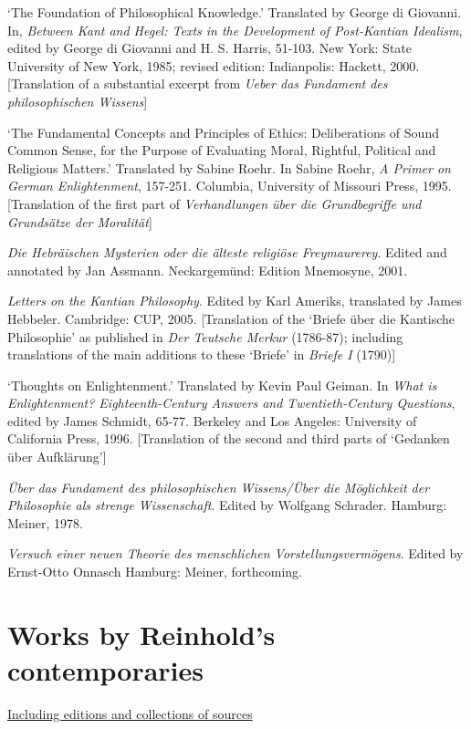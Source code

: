 `The Foundation of Philosophical Knowledge.' Translated by George di Giovanni. In, \textit{Between Kant and Hegel: Texts in the Development of Post{-}Kantian Idealism}, edited by George di Giovanni and H. S. Harris, 51{-}103. New York: State University of New York, 1985; revised edition: Indianpolis: Hackett, 2000. [Translation of a substantial excerpt from\textit{ Ueber das Fundament des philosophischen Wissens}]

`The Fundamental Concepts and Principles of Ethics: Deliberations of Sound Common Sense, for the Purpose of Evaluating Moral, Rightful, Political and Religious Matters.'  Translated by Sabine Roehr. In Sabine Roehr, \textit{A Primer on German Enlightenment}, 157{-}251. Columbia, University of Missouri Press, 1995. [Translation of the first part of \textit{Verhandlungen \"{u}ber die Grundbegriffe und Grunds\"{a}tze der Moralit\"{a}t}]

\textit{Die Hebr\"{a}ischen Mysterien oder die \"{a}lteste religi\"{o}se Freymaurerey}. Edited and annotated by Jan Assmann. Neckargem\"{u}nd: Edition Mnemosyne, 2001.

\textit{Letters on the Kantian Philosophy}. Edited by Karl Ameriks, translated by James Hebbeler. Cambridge: CUP, 2005. [Translation of the `Briefe \"{u}ber die Kantische Philosophie' as published in \textit{Der Teutsche Merkur} (1786{-}87); including translations of the main additions to these `Briefe' in \textit{Briefe I} (1790)]

`Thoughts on Enlightenment.' Translated by Kevin Paul Geiman. In \textit{What is Enlightenment? Eighteenth{-}Century Answers and Twentieth{-}Century Questions}, edited by James Schmidt, 65{-}77. Berkeley and Los Angeles: University of California Press, 1996. [Translation of the second and third parts of `Gedanken \"{u}ber Aufkl\"{a}rung']

\textit{\"{U}ber das Fundament des philosophischen Wissens/\"{U}ber die M\"{o}glichkeit der Philosophie als strenge Wissenschaft}. Edited by Wolfgang Schrader. Hamburg: Meiner, 1978.

\textit{Versuch einer neuen Theorie des menschlichen Vorstellungsverm\"{o}gens}. Edited by Ernst{-}Otto Onnasch Hamburg: Meiner, forthcoming.


\section{Works by Reinhold's contemporaries}


\ul{Including editions and collections of sources}

